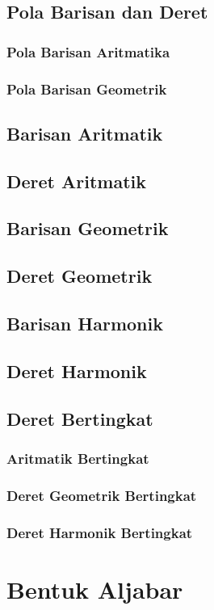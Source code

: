 \documentclass[12pt,a4paper,twoside,openany]{book}
\begin{document}
\section{Pola Barisan dan Deret}
\subsection{Pola Barisan Aritmatika}
\subsection{Pola Barisan Geometrik}

\section{Barisan Aritmatik}
\section{Deret Aritmatik}
\section{Barisan Geometrik}
\section{Deret Geometrik}
\section{Barisan Harmonik}
\section{Deret Harmonik}
\section{Deret Bertingkat}
\subsection{Aritmatik Bertingkat}
\subsection{Deret Geometrik Bertingkat}
\subsection{Deret Harmonik Bertingkat}

\chapter{Bentuk Aljabar}
\end{document}

